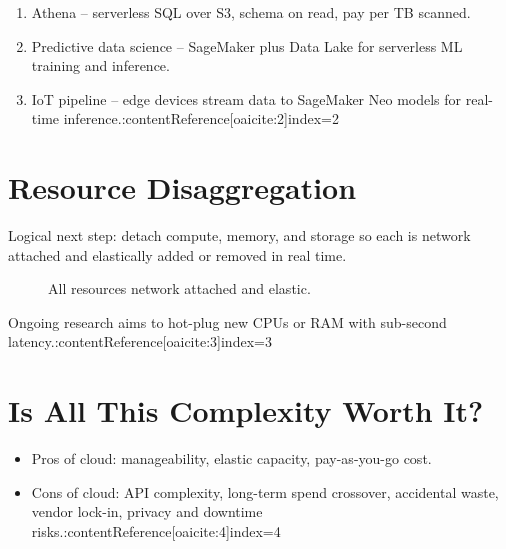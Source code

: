\documentclass[11pt]{article}
\begin{document}
\begin{enumerate}[itemsep=0pt]
  \item Athena -- serverless SQL over S3, schema on read, pay per TB scanned.
  \item Predictive data science -- SageMaker plus Data Lake for serverless ML training and inference.
  \item IoT pipeline -- edge devices stream data to SageMaker Neo models for real-time inference.:contentReference[oaicite:2]{index=2}
\end{enumerate}

\section{Resource Disaggregation}

Logical next step: detach compute, memory, and storage so each is network attached and elastically added or removed in real time.

\begin{figure}[h]
  \centering
  \caption{All resources network attached and elastic.}
\end{figure}

Ongoing research aims to hot-plug new CPUs or RAM with sub-second latency.:contentReference[oaicite:3]{index=3}

\section{Is All This Complexity Worth It?}

\begin{itemize}[itemsep=0pt]
  \item Pros of cloud: manageability, elastic capacity, pay-as-you-go cost.
  \item Cons of cloud: API complexity, long-term spend crossover, accidental waste, vendor lock-in, privacy and downtime risks.:contentReference[oaicite:4]{index=4}
\end{itemize}
\end{document}

